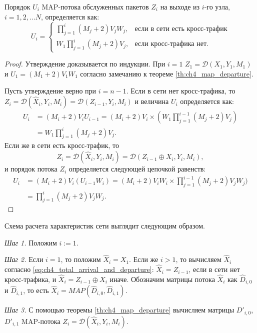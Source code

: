 \begin{prop}\label{prop:ch4_departure_order}
	Порядок $U_i$ MAP-потока обслуженных пакетов $Z_i$ на выходе из $i$-го узла, $i = 1,2,\dots N$, определяется как:
	$$
	U_i = \begin{cases}
		\prod\limits_{j=1}^{i}(M_j + 2)V_jW_j,&\text{если в сети есть кросс-трафик}\\
		W_1\prod\limits_{j=1}^{i}(M_j + 2)V_j,&\text{если кросс-трафика нет}.
	\end{cases}
	$$
\end{prop}
\begin{proof}
Утверждение доказывается по индукции. При $i = 1$ $Z_1 = \mathcal{D}(X_1, Y_1, M_1)$ и $U_1 = (M_1 + 2)V_1W_1$ согласно замечанию к теореме \ref{th:ch4_map_departure}.

Пусть утверждение верно при $i = n-1$. Если в сети нет кросс-трафика, то $Z_i = \mathcal{D}(\hat{X}_i, Y_i, M_i) = \mathcal{D}(Z_{i-1}, Y_i, M_i)$ и величина $U_i$ определяется как:
$$
  \begin{aligned}
    U_i &= (M_i + 2) V_i U_{i-1} = (M_i + 2) V_i \times (W_1 \prod\limits_{j=1}^{i-1}(M_j + 2)V_j)\\
    &= W_1 \prod\limits_{j=1}^{i}(M_j + 2)V_j.
  \end{aligned}
$$
Если же в сети есть кросс-трафик, то
$$
  Z_i = \mathcal{D}(\hat{X}_i, Y_i, M_i) = \mathcal{D}(Z_{i-1} \oplus X_i, Y_i, M_i),
$$
и порядок потока $Z_i$ определяется следующей цепочкой равенств:
$$
  \begin{aligned}
    U_i &= (M_i + 2) V_i (U_{i-1} W_i) = (M_i + 2) V_i W_i \times \prod\limits_{j=1}^{i-1}(M_j + 2) V_j W_j)\\
    &= \prod\limits_{j=1}^{i}(M_j + 2) V_j W_j.
  \end{aligned}
$$
\end{proof}

Схема расчета характеристик сети выглядит следующим образом.

\textit{Шаг 1.} Положим $i := 1$.

\textit{Шаг 2.} Если $i = 1$, то положим $\hat{X}_i = X_1$. Если же $i > 1$, то вычисляем $\hat{X}_i$ согласно \eqref{eq:ch4_total_arrival_and_departure}: $\hat{X}_i = Z_{i-1}$, если в сети нет кросс-трафика, и $\hat{X}_i = Z_{i-1} \oplus X_i$ иначе. Обозначим матрицы потока $\hat{X}_i$ как $\hat{D}_{i,0}$ и $\hat{D}_{i,1}$, то есть $\hat{X}_i = MAP(\hat{D}_{i,0}, \hat{D}_{i,1})$.

\textit{Шаг 3.} С помощью теоремы \ref{th:ch4_map_departure} вычисляем матрицы $D'_{i,0}$, $D'_{i,1}$ MAP-потока $Z_i = \mathcal{D}(\hat{X}_i, Y_i, M_i)$.

